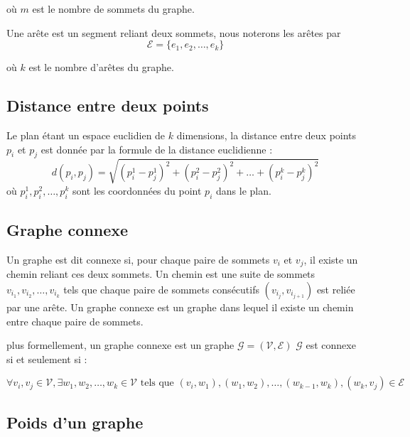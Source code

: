 \documentclass[12pt,a4paper]{article}
\begin{document}
où \( m \) est le nombre de sommets du graphe.

Une arête est un segment reliant deux sommets,
nous noterons les arêtes par
\begin{equation*}
    \mathcal{E}  = \{ e_1, e_2, \ldots, e_k \}
\end{equation*}

où \( k \) est le nombre d'arêtes du graphe.


\subsection{Distance entre deux points}

Le plan étant un espace euclidien de $k$ dimensions,
la distance entre deux points \( p_i \) et \( p_j \) est donnée par la formule de la distance euclidienne :
\begin{equation*}
    d(p_i, p_j) = \sqrt{(p_i^1 - p_j^1)^2 + (p_i^2 - p_j^2)^2 + \ldots + (p_i^k - p_j^k)^2}
\end{equation*}
où \( p_i^1, p_i^2, \ldots, p_i^k \) sont les coordonnées du point \( p_i \) dans le plan.

\subsection{Graphe connexe}

Un graphe est dit connexe si, pour chaque paire de sommets \( v_i \) et \( v_j \), il existe un chemin reliant ces deux sommets.
Un chemin est une suite de sommets \( v_{i_1}, v_{i_2}, \ldots, v_{i_k} \) tels que chaque paire de sommets consécutifs \( (v_{i_j}, v_{i_{j+1}}) \) est reliée par une arête.
Un graphe connexe est un graphe dans lequel il existe un chemin entre chaque paire de sommets.

plus formellement, un graphe connexe est un graphe \( \mathcal{G} = (\mathcal{V}, \mathcal{E}) \) 
$\mathcal{G}$ est connexe si et seulement si :

\begin{equation*}
    \forall v_i, v_j \in \mathcal{V}, \exists w_1, w_2, \ldots, w_k \in \mathcal{V} \text{ tels que } (v_i, w_1), (w_1, w_2), \ldots, (w_{k-1}, w_k), (w_k, v_j) \in \mathcal{E}
\end{equation*}

\subsection{Poids d'un graphe}
\end{document}
